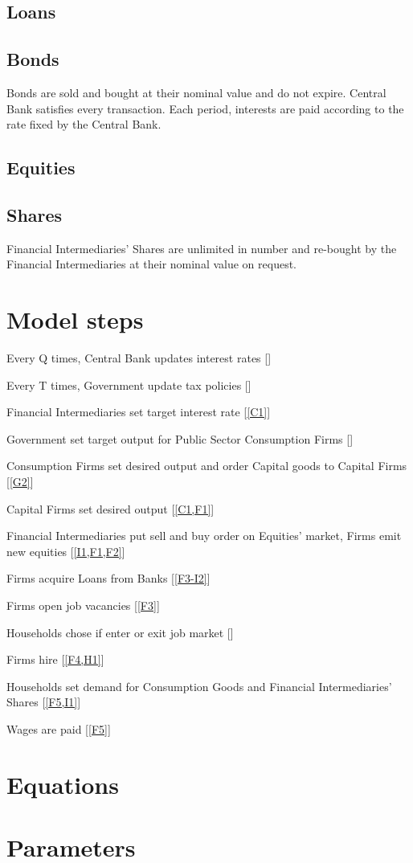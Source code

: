 \documentclass[a4paper, headings=standardclasses]{scrartcl}
\newcommand{\litem}[1]{\item[#1] \label{#1}}
\begin{document}
\subsection{Loans}

\subsection{Bonds}
Bonds are sold and bought at their nominal value and do not expire. Central Bank satisfies every transaction. Each period, interests are paid according to the rate fixed by the Central Bank.

\subsection{Equities}

\subsection{Shares}
Financial Intermediaries' Shares are unlimited in number and re-bought by the Financial Intermediaries at their nominal value on request.

\section{Model steps}
\begin{steps}
	\litem{C1} Every Q times, Central Bank updates interest rates []
	\litem{G1} Every T times, Government update tax policies []
	\litem{I1} Financial Intermediaries set target interest rate [\cref{C1}]
	\litem{G2} Government set target output for Public Sector Consumption Firms []
	\litem{F1} Consumption Firms set desired output and order Capital goods to Capital Firms [\cref{G2}]
	\litem{F2} Capital Firms set desired output [\cref{C1,F1}]
	\litem{F3-I2} Financial Intermediaries put sell and buy order on Equities' market, Firms emit new equities [\cref{I1,F1,F2}]
	\litem{F4} Firms acquire Loans from Banks [\cref{F3-I2}]
	\litem{F5} Firms open job vacancies [\cref{F3}]
	\litem{H1} Households chose if enter or exit job market []
	\litem{F6} Firms hire [\cref{F4,H1}]
	\litem{H2} Households set demand for Consumption Goods and Financial Intermediaries' Shares [\cref{F5,I1}]
	\litem{F6} Wages are paid [\cref{F5}]
	
\end{steps}

\section{Equations}

\section{Parameters}
	
	\printbibliography
	
\end{document}

